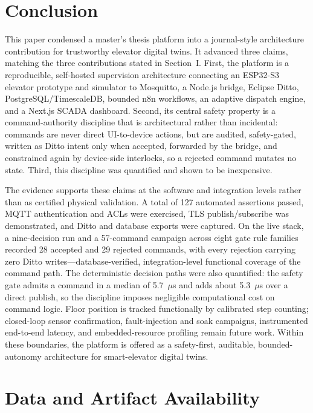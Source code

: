 \documentclass[journal]{IEEEtran}
\begin{document}
\section{Conclusion}

This paper condensed a master's thesis platform into a journal-style architecture contribution for trustworthy elevator digital twins. It advanced three claims, matching the three contributions stated in Section~I. First, the platform is a reproducible, self-hosted supervision architecture connecting an ESP32-S3 elevator prototype and simulator to Mosquitto, a Node.js bridge, Eclipse Ditto, PostgreSQL/TimescaleDB, bounded n8n workflows, an adaptive dispatch engine, and a Next.js SCADA dashboard. Second, its central safety property is a command-authority discipline that is architectural rather than incidental: commands are never direct UI-to-device actions, but are audited, safety-gated, written as Ditto intent only when accepted, forwarded by the bridge, and constrained again by device-side interlocks, so a rejected command mutates no state. Third, this discipline was quantified and shown to be inexpensive.

The evidence supports these claims at the software and integration levels rather than as certified physical validation. A total of 127 automated assertions passed, MQTT authentication and ACLs were exercised, TLS publish/subscribe was demonstrated, and Ditto and database exports were captured. On the live stack, a nine-decision run and a 57-command campaign across eight gate rule families recorded 28 accepted and 29 rejected commands, with every rejection carrying zero Ditto writes---database-verified, integration-level functional coverage of the command path. The deterministic decision paths were also quantified: the safety gate admits a command in a median of 5.7~$\mu$s and adds about 5.3~$\mu$s over a direct publish, so the discipline imposes negligible computational cost on command logic. Floor position is tracked functionally by calibrated step counting; closed-loop sensor confirmation, fault-injection and soak campaigns, instrumented end-to-end latency, and embedded-resource profiling remain future work. Within these boundaries, the platform is offered as a safety-first, auditable, bounded-autonomy architecture for smart-elevator digital twins.

\section*{Data and Artifact Availability}
\end{document}
